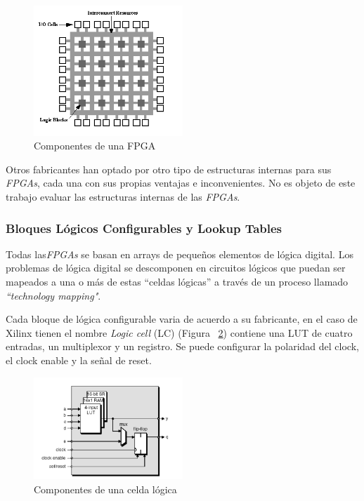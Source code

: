 	\begin{figure}[h!]
 	\begin{center}
   	\includegraphics[width=0.5\textwidth,keepaspectratio=true]{./images/fpga1a}
  	\caption{Componentes de una FPGA}
  	\label{fig:compfpga}
 	\end{center}
	\end{figure}

	\vspace{0.5cm}
	\par
	Otros fabricantes han optado por otro tipo de estructuras internas para sus \textit{FPGAs}, cada una con sus propias ventajas e inconvenientes. No es objeto
	de este trabajo evaluar las estructuras internas de las \textit{FPGAs}.
	
		\subsubsection{Bloques Lógicos Configurables y Lookup Tables}
		\par
		Todas las\textit{FPGAs} se basan en arrays de pequeños elementos de lógica digital. Los problemas de lógica digital se descomponen en circuitos
		lógicos que puedan ser mapeados a una o más de estas “celdas lógicas” a través de un proceso llamado \textit{“technology mapping"}.
		\vspace{0.5cm}
		\par
		Cada bloque de lógica configurable varia de acuerdo a su fabricante, en el caso de Xilinx tienen el nombre \textit{Logic cell} (LC) (Figura
		~\ref{fig:complc}) contiene una LUT de cuatro entradas, un multiplexor y un registro. Se puede configurar la polaridad del clock, el clock enable y
		la señal de reset.

		\begin{figure}[h!]
		\begin{center}
 		\includegraphics[width=0.5\textwidth,keepaspectratio=true]{./images/celda}
  		\caption{Componentes de una celda lógica}
  		\label{fig:complc}
 		\end{center}
		\end{figure}


